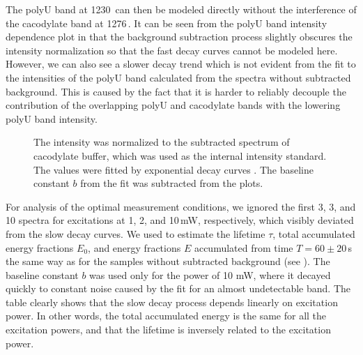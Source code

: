 The polyU band at 1230\,\icm{} can then be modeled directly without the
interference of the cacodylate band at 1276\,\icm{}.
It can be seen from the polyU band intensity dependence plot in
that the background subtraction process slightly obscures the intensity
normalization so that the fast decay curves cannot be modeled here.
However, we can also see a slower decay trend which is not evident from the fit
to the intensities of the polyU band calculated from the spectra without
subtracted background.
This is caused by the fact that it is harder to reliably decouple
the contribution of the overlapping polyU and cacodylate bands with the
lowering polyU band intensity.

\begin{figure}
	\centering
	
	\caption[%
		Decrease of the integral intensity of the polyU band at 1231\,\icm{}
		for different excitation powers in background-corrected spectra.%
	]{%
		The intensity was normalized to the subtracted spectrum of cacodylate
		buffer, which was used as the internal intensity standard.
		The values were fitted by exponential decay curves
		.
		The baseline constant $b$ from the fit was subtracted from the plots.
	}
	\label{\figlabel{power_optim:triplexes2}}
\end{figure}

For analysis of the optimal measurement conditions, we ignored the first 3, 3,
and 10 spectra for excitations at 1, 2, and 10\,mW, respectively, which visibly
deviated from the slow decay curves.
We used
to estimate the lifetime $\tau$, total accumulated energy fractions $E_0$, and
energy fractions $E$ accumulated from time $T = 60\pm20$\,s the same way as
for the samples without subtracted background (see
).
The baseline constant $b$ was used only for the power of 10 mW, where it
decayed quickly to constant noise caused by the fit for an almost undetectable
band.
The table clearly shows that the slow decay process depends linearly on
excitation power.
In other words, the total accumulated energy is the same for all the
excitation powers, and that the lifetime is inversely related to the excitation
power.

